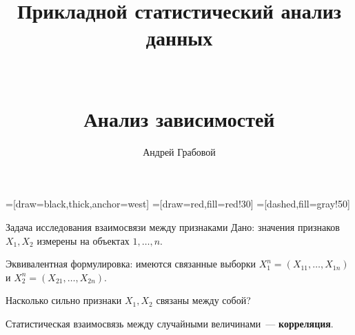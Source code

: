 \documentclass[9pt,pdf,utf8,hyperref={unicode},aspectratio=169]{beamer}
\title[Анализ зависимостей]{Прикладной статистический анализ данных\\~\\~\\\small{Анализ зависимостей}}
\author{Андрей Грабовой}
\date{}
\begin{document}
=[draw=black,thick,anchor=west]
=[draw=red,fill=red!30]
=[dashed,fill=gray!50]

\begin{frame}
    \titlepage
\end{frame}

\begin{frame}{Задача исследования взаимосвязи между признаками}
% 
	Дано: значения признаков $X_1,X_2$ измерены на объектах $1,\ldots,n.$
	
	Эквивалентная формулировка: имеются связанные выборки $X_1^n = \left(X_{11},\ldots,X_{1n}\right)$ и $X_2^n = \left(X_{21},\ldots,X_{2n}\right)$.
	
	\bigskip
	
	Насколько сильно признаки $X_1,X_2$ связаны между собой?
	
	\bigskip
	
	Статистическая взаимосвязь между случайными величинами~--- \textbf{корреляция}.
\end{frame}
\end{document}
